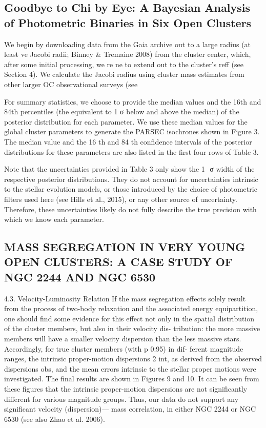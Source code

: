 \documentclass[../Main.tex]{subfiles}
\begin{document}
{\subsection{Goodbye to Chi by Eye: A Bayesian Analysis of Photometric Binaries in Six Open Clusters}

We begin by downloading data from the Gaia archive out to
a large radius (at least ve Jacobi radii; Binney &
Tremaine 2008) from the cluster center, which, after some
initial processing, we re ne to extend out to the cluster’s reff
(see Section 4). We calculate the Jacobi radius using cluster
mass estimates from other larger OC observational surveys (see

For summary statistics, we choose to provide the median values and the 16th and 84th percentiles (the equivalent to 1
σ
 below and above the median) of the posterior distribution for each parameter. We use these median values for the global cluster parameters to generate the PARSEC isochrones shown in Figure 3. The median value and the 
16
th
 and
84
th
 confidence intervals of the posterior distributions for these parameters are also listed in the first four rows of Table 3.

 Note that the uncertainties provided in Table 3 only show the 
1
⁢
σ
 width of the respective posterior distributions. They do not account for uncertainties intrinsic to the stellar evolution models, or those introduced by the choice of photometric filters used here (see Hills et al., 2015), or any other source of uncertainty. Therefore, these uncertainties likely do not fully describe the true precision with which we know each parameter. 

\subsection{MASS SEGREGATION IN VERY YOUNG OPEN CLUSTERS:
A CASE STUDY OF NGC 2244 AND NGC 6530}

4.3. Velocity-Luminosity Relation
If the mass segregation effects solely result from the process of
two-body relaxation and the associated energy equipartition, one
should find some evidence for this effect not only in the spatial
distribution of the cluster members, but also in their velocity dis-
tribution: the more massive members will have a smaller velocity
dispersion than the less massive stars.
Accordingly, for true cluster members (with p 0:95) in dif-
ferent magnitude ranges, the intrinsic proper-motion dispersions 2
int, as derived from the observed dispersions obs, and the mean
errors intrinsic to the stellar proper motions were investigated.
The final results are shown in Figures 9 and 10. It can be seen
from these figures that the intrinsic proper-motion dispersions
are not significantly different for various magnitude groups. Thus,
our data do not support any significant velocity (dispersion)—
mass correlation, in either NGC 2244 or NGC 6530 (see also Zhao
et al. 2006).

}
\end{document}
